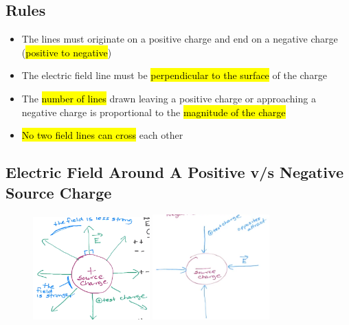 \documentclass[a4paper,12pt]{article}
\begin{document}
\subsection{Rules}
\begin{itemize}
    \item{The lines must originate on a positive charge and end on a negative charge (\hl{positive to negative})}
    \item{The electric field line must be \hl{perpendicular to the surface} of the charge}
    \item{The \hl{number of lines} drawn leaving a positive charge or approaching a negative charge is proportional to the \hl{magnitude of the charge}}
    \item{\hl{No two field lines can cross} each other}
\end{itemize}

\subsection{Electric Field Around A Positive v/s Negative Source Charge}
\begin{figure}[H]
    \centering
    \includegraphics[width=0.4\textwidth]{lines}
    \includegraphics[width=0.4\textwidth]{lines2}
\end{figure}
\end{document}
